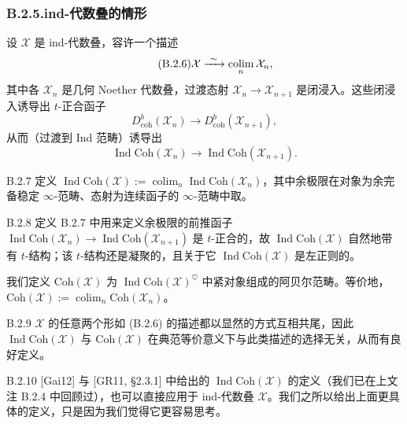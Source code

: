 \subsubsection*{B.2.5.\quad ind-代数叠的情形}
设 $\mathcal X$ 是 ind-代数叠，容许一个描述
\begin{equation}\tag{B.2.6}\label{eq:a4-18-11}
\mathcal X\xrightarrow{\ \sim\ }\operatorname*{colim}_n\mathcal X_n,
\end{equation}
其中各 $\mathcal X_n$ 是几何 Noether 代数叠，过渡态射 $\mathcal X_n\to\mathcal X_{n+1}$ 是闭浸入。这些闭浸入诱导出 $t$-正合函子
\[
D^b_{\mathrm{coh}}(\mathcal X_n)\to D^b_{\mathrm{coh}}(\mathcal X_{n+1}),
\]
从而（过渡到 Ind 范畴）诱导出
\[
\operatorname{Ind}\mathrm{Coh}(\mathcal X_n)\to\operatorname{Ind}\mathrm{Coh}(\mathcal X_{n+1}).
\]

\begin{defn}{B.2.7}\label{thm:a4-18-24}
定义 $\operatorname{Ind}\mathrm{Coh}(\mathcal X):=\operatorname*{colim}_n\operatorname{Ind}\mathrm{Coh}(\mathcal X_n)$，其中余极限在对象为余完备稳定 $\infty$-范畴、态射为连续函子的 $\infty$-范畴中取。
\end{defn}

\begin{rem}{B.2.8}\label{thm:a4-18-25}
定义 B.2.7 中用来定义余极限的前推函子 $\operatorname{Ind}\mathrm{Coh}(\mathcal X_n)\to\operatorname{Ind}\mathrm{Coh}(\mathcal X_{n+1})$ 是 $t$-正合的，故 $\operatorname{Ind}\mathrm{Coh}(\mathcal X)$ 自然地带有 $t$-结构；该 $t$-结构还是凝聚的，且关于它 $\operatorname{Ind}\mathrm{Coh}(\mathcal X)$ 是左正则的。

我们定义 $\mathrm{Coh}(\mathcal X)$ 为 $\operatorname{Ind}\mathrm{Coh}(\mathcal X)^{\heartsuit}$ 中紧对象组成的阿贝尔范畴。等价地，$\mathrm{Coh}(\mathcal X):=\operatorname*{colim}_n\mathrm{Coh}(\mathcal X_n)$。
\end{rem}

\begin{rem}{B.2.9}\label{thm:a4-18-26}
$\mathcal X$ 的任意两个形如 (B.2.6) 的描述都以显然的方式互相共尾，因此 $\operatorname{Ind}\mathrm{Coh}(\mathcal X)$ 与 $\mathrm{Coh}(\mathcal X)$ 在典范等价意义下与此类描述的选择无关，从而有良好定义。
\end{rem}

\begin{rem}{B.2.10}\label{thm:a4-18-27}
[Gai12] 与 [GR11, §2.3.1] 中给出的 $\operatorname{Ind}\mathrm{Coh}(\mathcal X)$ 的定义（我们已在上文注 B.2.4 中回顾过），也可以直接应用于 ind-代数叠 $\mathcal X$。我们之所以给出上面更具体的定义，只是因为我们觉得它更容易思考。
\end{rem}

